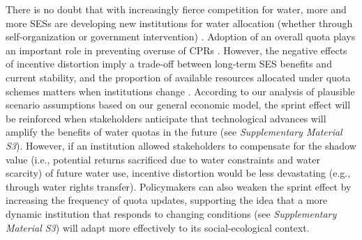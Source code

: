 \documentclass{nsr}
\begin{document}
There is no doubt that with increasingly fierce competition for water, more and more SESs are developing new institutions for water allocation (whether through self-organization or government intervention) \cite{anderssonVoluntaryleadershipemergence2020, wutichWaterScarcitySustainability2009}.
Adoption of an overall quota plays an important role in preventing overuse of CPRs \cite{tilmanLocalizedprosocialpreferences2019}.
However, the negative effects of incentive distortion imply a trade-off between long-term SES benefits and current stability, and the proportion of available resources allocated under quota schemes matters when institutions change \cite{ladeRegimeshiftssocialecological2013}.
According to our analysis of plausible scenario assumptions based on our general economic model, the sprint effect will be reinforced when stakeholders anticipate that technological advances will amplify the benefits of water quotas in the future (see \textit{Supplementary Material S3}).
However, if an institution allowed stakeholders to compensate for the shadow value (i.e., potential returns sacrificed due to water constraints and water scarcity) \cite{howarthAccountingvalueecosystem2002} of future water use, incentive distortion would be less devastating (e.g., through water rights transfer).
Policymakers can also weaken the sprint effect by increasing the frequency of quota updates, supporting the idea that a more dynamic institution that responds to changing conditions (see \textit{Supplementary Material S3}) will adapt more effectively to its social-ecological context.
\end{document}
